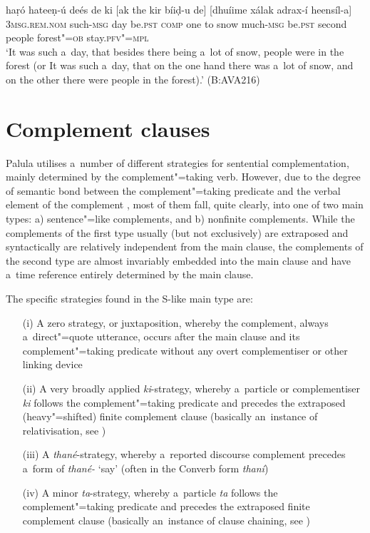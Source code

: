 \begin{exe}
\ex
\label{ex:13-126}
\gll haṛó hateeṇ-ú deés de ki [ak  the kir bíiḍ-u de] [dhuíime xálak  adrax-í heensíl-a] \\
\textsc{3msg.rem.nom} such-\textsc{msg}  day be.\textsc{pst} \textsc{comp} one  to snow much-\textsc{msg} be.\textsc{pst} second people  forest"=\textsc{ob} stay.\textsc{pfv"=mpl} \\
\glt `It was such a~day, that besides there being a~lot of snow, people were in the forest (or It was such a~day, that on the one hand there was a~lot of snow, and on the other there were people in the forest).' (B:AVA216)
\end{exe}

\section{Complement clauses}
\label{sec:13-5}

Palula utilises a~number of different strategies for sentential complementation, mainly determined by the complement"=taking verb. However, due to the degree of semantic bond between the complement"=taking predicate and the verbal element of the complement \citep[39-40]{givon2001b}, most of them fall, quite clearly, into one of two main types: a) sentence"=like complements, and b) nonfinite complements. While the complements of the first type usually (but not exclusively) are extraposed and syntactically are relatively independent from the main clause, the complements of the second type are almost invariably embedded into the main clause and have a~time reference entirely determined by the main clause.

The specific strategies found in the S-like main type are:

\begin{enumerate}
\item[(i)] A zero strategy, or juxtaposition, whereby the complement, always a~direct"=quote utterance, occurs after the main clause and its complement"=taking predicate without any overt complementiser or other linking device
\item[(ii)] A very broadly applied \textit{ki}-strategy, whereby a~particle or complementiser \textit{ki} follows the complement"=taking predicate and precedes the extraposed (heavy"=shifted) finite complement clause (basically an~instance of relativisation, see )
\item[(iii)] A \textit{thané}-strategy, whereby a~reported discourse complement precedes a~form of \textit{thané-} `say' (often in the Converb form \textit{thaní})
\item[(iv)] A minor \textit{ta}-strategy, whereby a~particle \textit{ta} follows the complement"=taking predicate and precedes the extraposed finite complement clause (basically an~instance of clause chaining, see )
\end{enumerate}

